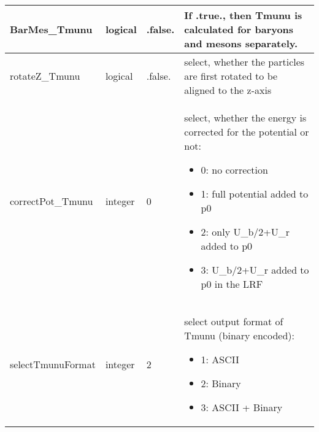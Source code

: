 \documentclass{article}
\begin{document}
\begin{longtable}{llll}
\midrule
BarMes\_Tmunu & \begin{minipage}[t]{2cm}logical\end{minipage} & \begin{minipage}[t]{2cm}.false.\end{minipage} & \begin{minipage}[t]{12cm}If .true., then Tmunu is calculated for baryons and mesons separately.\end{minipage}\\*
\midrule
rotateZ\_Tmunu & \begin{minipage}[t]{2cm}logical\end{minipage} & \begin{minipage}[t]{2cm}.false.\end{minipage} & \begin{minipage}[t]{12cm}select, whether the particles are first rotated to be aligned to the z-axis\end{minipage}\\*
\midrule
correctPot\_Tmunu & \begin{minipage}[t]{2cm}integer\end{minipage} & \begin{minipage}[t]{2cm}0\end{minipage} & \begin{minipage}[t]{12cm}select, whether the energy is corrected for the potential or not:\begin{itemize}\leftmargin0em\itemindent0pt\item 0: no correction\item 1: full potential added to p0\item 2: only U\_b/2+U\_r added to p0\item 3: U\_b/2+U\_r added to p0 in the LRF\end{itemize}\end{minipage}\\*
\midrule
selectTmunuFormat & \begin{minipage}[t]{2cm}integer\end{minipage} & \begin{minipage}[t]{2cm}2\end{minipage} & \begin{minipage}[t]{12cm}select output format of Tmunu (binary encoded):\begin{itemize}\leftmargin0em\itemindent0pt\item 1: ASCII\item 2: Binary\item 3: ASCII + Binary\end{itemize}\end{minipage}\\*

\end{longtable}
\end{document}
